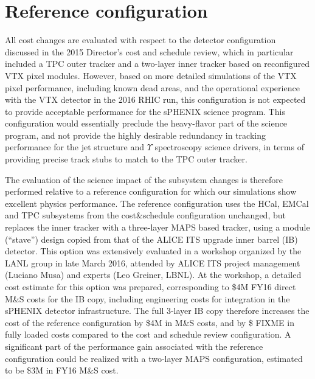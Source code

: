 \section{Reference configuration}

All cost changes are evaluated with respect to the detector configuration discussed in the 2015 Director's cost and schedule review,  
which in particular included a TPC outer tracker and a two-layer inner tracker based on reconfigured VTX pixel modules. However, based on
more detailed simulations of the VTX pixel performance, including known dead areas, and the operational experience with the VTX detector 
in the 2016 RHIC run, this configuration is not expected to provide acceptable performance for the sPHENIX science program. This configuration
would essentially preclude the heavy-flavor part of the science program, and not provide the highly desirable redundancy in tracking performance
for the jet structure and $\Upsilon$ spectroscopy science drivers, in terms of providing precise track stubs to match to the TPC outer tracker. 

The evaluation of the science impact of the subsystem changes is therefore performed relative to a reference configuration for 
which our simulations show excellent physics performance. The reference configuration uses the HCal, EMCal and TPC subsystems 
from the cost\&schedule configuration unchanged, but replaces the inner tracker with a three-layer MAPS based tracker, using a module (``stave'')
design copied from that of the ALICE ITS upgrade inner barrel (IB) detector. This option was extensively evaluated in a workshop
organized by the LANL group in late March 2016, attended by ALICE ITS project management (Luciano Musa) and experts (Leo Greiner, LBNL). 
At the workshop, a detailed cost estimate for this option was prepared, corresponding to \$4M FY16 direct M\&S costs for the IB copy, 
including engineering costs for integration in the sPHENIX detector infrastructure. The full 3-layer IB copy therefore increases
the cost of the reference configuration by \$4M in M\&S costs, and by
\$ FIXME in fully loaded costs compared to the cost and schedule review
configuration. A significant part of the performance gain associated with the reference configuration could be realized with a two-layer MAPS
configuration, estimated to be \$3M in FY16 M\&S cost.


